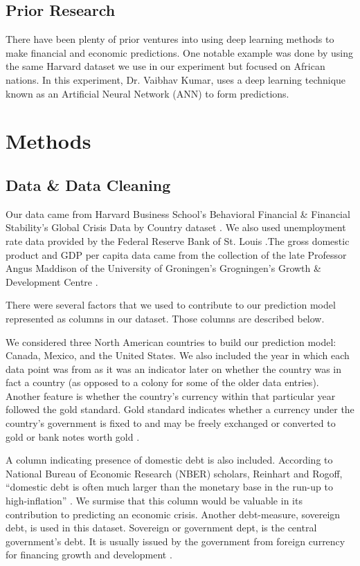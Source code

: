 \documentclass[12pt]{article}
\begin{document}
\subsection{Prior Research}
There have been plenty of prior ventures into using deep learning methods to make financial and economic predictions. One notable example was done by using the same Harvard dataset we use in our experiment but focused on African nations\cite{kumar}. In this experiment, Dr. Vaibhav Kumar, uses a deep learning technique known as an Artificial Neural Network (ANN) to form predictions\cite{kumar}. 

\section{Methods}
\subsection{Data \& Data Cleaning}
Our data came from Harvard Business School’s Behavioral Financial & Financial Stability’s Global Crisis Data by Country dataset \cite{harvard}. We also used unemployment rate data provided by the Federal Reserve Bank of St. Louis \cite{fred}.The gross domestic product and GDP per capita data came from the collection of the late Professor Angus Maddison of the University of Groningen’s Grogningen’s Growth & Development Centre \cite{ggdc}.

There were several factors that we used to contribute to our prediction model represented as columns in our dataset. Those columns are described below.

We considered three North American countries to build our prediction model: Canada, Mexico, and the United States. We also included the year in which each data point was from as it was an indicator later on whether the country was in fact a country (as opposed to a colony for some of the older data entries). 
Another feature is whether the country’s currency within that particular year followed the gold standard. Gold standard indicates whether a currency under the country’s government is fixed to and may be freely exchanged or converted to gold or bank notes worth gold \cite{chengold}.

A column indicating presence of domestic debt is also included. According to National Bureau of Economic Research (NBER) scholars, Reinhart and Rogoff, “domestic debt is often much larger than the monetary base in the run-up to high-inflation” \cite{nber}. We surmise that this column would be valuable in its contribution to predicting an economic crisis. Another debt-measure, sovereign debt, is used in this dataset. Sovereign or government dept, is the central government's debt. It is usually issued by the government from foreign currency for financing growth and development \cite{chensovereign}.
\end{document}

